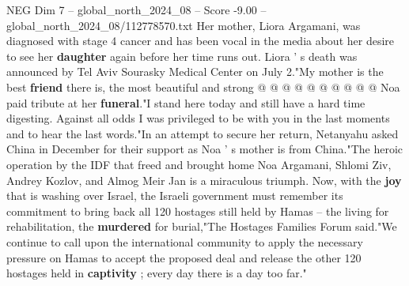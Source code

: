 \begin{textsample}{NEG Dim 7 – global\_north\_2024\_08 – Score -9.00 – global\_north\_2024\_08/112778570.txt}
Her mother, Liora Argamani, was diagnosed with stage 4 cancer and has been vocal in the media about her desire to see her \textbf{daughter} again before her time runs out.
Liora ' s death was announced by Tel Aviv Sourasky Medical Center on July 2."My mother is the best \textbf{friend} there is, the most beautiful and strong @ @ @ @ @ @ @ @ @ @ Noa paid tribute at her \textbf{funeral}."I stand here today and still have a hard time digesting.
Against all odds I was privileged to be with you in the last moments and to hear the last words."In an attempt to secure her return, Netanyahu asked China in December for their support as Noa ' s mother is from China."The heroic operation by the IDF that freed and brought home Noa Argamani, Shlomi Ziv, Andrey Kozlov, and Almog Meir Jan is a miraculous triumph.
Now, with the \textbf{joy} that is washing over Israel, the Israeli government must remember its commitment to bring back all 120 hostages still held by Hamas -- the living for rehabilitation, the \textbf{murdered} for burial,"The Hostages Families Forum said."We continue to call upon the international community to apply the necessary pressure on Hamas to accept the proposed deal and release the other 120 hostages held in \textbf{captivity} ; every day there is a day too far."

\end{textsample}
